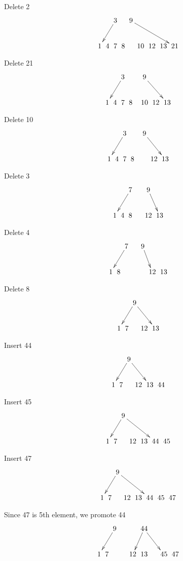 \documentclass[a4paper]{article}
\begin{document}
Delete 2
$$\xymatrix @C=0pt {
  &   &    &   &    & \ar[dll] 3 &  &  9 \ar[drrrr]   &  \\
  &   &   &  1 &  4  & 7 &  8 &   &  10 &  12 &  13 &  21 \\
}$$

Delete 21
$$\xymatrix @C=0pt {
  &   &    &   &    & \ar[dll] 3  &  &  & 9 \ar[drr]   &  \\
  &   &   &  1 &  4  & 7 &  8 &   &  10 &  12 &  13  \\
}$$

Delete 10
$$\xymatrix @C=0pt {
  &   &    &   &    & \ar[dll] 3   &  &  &  9 \ar[drr]   &  \\
  &   &   &  1 &  4  & 7 &  8 &   & &  12 &  13  \\
}$$

Delete 3
$$\xymatrix @C=0pt {
  &   &    &   &    & \ar[dll] 7   &  &  &  9 \ar[dr]   &  \\
  &   &   &  1 &  4  &  8 &   & &  12 &  13  \\
}$$

Delete 4
$$\xymatrix @C=0pt {
  &   &    &   &    & \ar[dll] 7   &  &  &  9 \ar[dr]   &  \\
  &   &   &  1  &  8 &   & &  & &  12 &  13  \\
}$$

Delete 8
$$\xymatrix @C=0pt {
  &   &   &    &    &\ar[dll]  9 \ar[drr] &     &  \\
  &   &   &  1 &  7 &   &  12 &  13  \\
}$$

Insert 44
$$\xymatrix @C=0pt {
  &   &   &    &    &\ar[dll]  9 \ar[drr] &     &  \\
  &   &   &  1 &  7 &   &  12 &  13 &  44 \\
}$$

Insert 45
$$\xymatrix @C=0pt {
  &   &   &    &    &\ar[dll]  9 \ar[drrr] &     &  \\
  &   &   &  1 &  7 &   &  12 &  13 &  44 & 45 \\
}$$

Insert 47
$$\xymatrix @C=0pt {
  &   &   &    &    &\ar[dll]  9 \ar[drrr] &     &  \\
  &   &   &  1 &  7 &   &  12 &  13 &  44 & 45 &  47\\
}$$

Since 47 is 5th element, we promote 44
$$\xymatrix @C=0pt {
  &   &    &   &    & \ar[dll] 9  & & &  & \ar[dl] 44 \ar[drrr]   &  \\
  &   &   &  1 &  7 &   &  & &  12 &  13 & & & 45 &  47 \\
}$$
\end{document}
